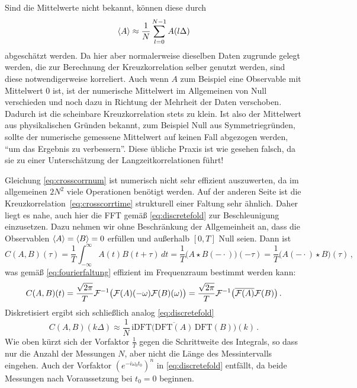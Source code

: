 Sind die Mittelwerte nicht bekannt, können diese durch
\begin{equation}
  \left\langle{A}\right\rangle\approx
  \frac{1}{N}\sum_{l=0}^{N-1}A(l\Delta)
\end{equation}
abgeschätzt werden. Da hier aber normalerweise dieselben Daten zugrunde gelegt
werden, die zur Berechnung der Kreuzkorrelation selber genutzt
werden, sind diese notwendigerweise korreliert. Auch wenn $A$ zum Beispiel eine
Observable mit Mittelwert 0 ist, ist der numerische Mittelwert im Allgemeinen
von Null verschieden und noch dazu in Richtung der Mehrheit der Daten
verschoben. Dadurch ist die scheinbare Kreuzkorrelation stets zu klein. Ist also
der Mittelwert aus physikalischen Gründen bekannt, zum Beispiel Null aus Symmetriegründen, sollte der numerische gemessene
Mittelwert auf keinen Fall abgezogen werden, "`um das Ergebnis zu verbessern"'. Diese übliche Praxis ist wie gesehen falsch, da sie zu einer
Unterschätzung der Langzeitkorrelationen führt!

Gleichung \eqref{eq:crosscorrnum} ist numerisch nicht sehr
effizient auszuwerten, da im allgemeinen $2N^2$ viele Operationen
benötigt werden. Auf der anderen Seite ist die
Kreuzkorrelation~\eqref{eq:crosscorrtime} strukturell einer Faltung
sehr ähnlich.  Daher liegt es nahe, auch hier die FFT gemäß
\eqref{eq:discretefold} zur Beschleunigung einzusetzen. Dazu nehmen wir ohne Beschränkung der Allgemeinheit an, dass die Observablen $\left\langle{A}\right\rangle=\left\langle{B}\right\rangle=0$ erfüllen und  außerhalb $[0,T]$ Null seien. Dann ist
\begin{equation}
  C(A,B)(\tau) =
  \frac{1}{T}\int_{-\infty}^{\infty} A(t)B(t+\tau)\,dt
  =  
  \frac{1}{T}\bigl(A \star B(-\cdot)\bigr)(-\tau) =
  \frac{1}{T} \bigl(A(-\cdot) \star B\bigr)(\tau)\,,
\end{equation}
was gemäß \eqref{eq:fourierfaltung} effizient im Frequenzraum bestimmt werden kann:
\begin{equation}
  \label{eq:crosscorrfft}
  C(A,B)(t) = \frac{\sqrt{2\pi}}{T}\mathcal F^{-1}
  \bigl(\mathcal F(A)(-\omega)\mathcal F(B)(\omega)\bigr) = \frac{\sqrt{2\pi}}{T}\mathcal F^{-1}
  \bigl(\overline{\mathcal F(A)}\mathcal F(B)\bigr)\,.
\end{equation}
Diskretisiert ergibt sich schließlich analog \eqref{eq:discretefold}
\begin{equation}
  \label{eq:crosscorrnumfft}
  C(A,B)(k\Delta)
  \approx
  \frac{1}{N}\,\text{iDFT}
  \bigl(\overline{\text{DFT}(A)}\,\text{DFT}(B)\bigr)(k)\,.
\end{equation}
Wie oben kürzt sich der Vorfaktor $\frac{1}{T}$ gegen die Schrittweite
des Integrals, so dass nur die Anzahl der Messungen $N$, aber nicht
die Länge des Messintervalls eingehen. Auch der Vorfaktor
$\left(e^{-i\omega_0 t_0}\right)^n$ in \eqref{eq:discretefold}
entfällt, da beide Messungen nach Voraussetzung bei $t_0=0$ beginnen.

